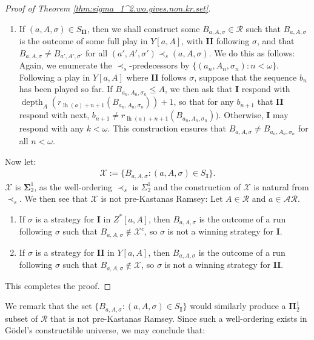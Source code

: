 \documentclass[11pt,reqno]{amsart}
\theoremstyle{plain}
\numberwithin{equation}{section}
\theoremstyle{definition}
\newcommand{\func}{\operatorname}
\newcommand{\cal}{\mathcal}
\newcommand{\X}{\cal{X}}
\newcommand{\lh}{\func{lh}}
\newcommand{\depth}{\func{depth}}
\begin{document}
\begin{proof}[Proof of Theorem \ref{thm:sigma_1^2.wo.gives.non.kr.set}]
\begin{enumerate}
        \item If $(a,A,\sigma) \in S_\textbf{II}$, then we shall construct some $B_{a,A,\sigma} \in \cal{R}$ such that $B_{a,A,\sigma}$ is the outcome of some full play in $Y[a,A]$, with \textbf{II} following $\sigma$, and that $B_{a,A,\sigma} \neq B_{a',A',\sigma'}$ for all $(a',A',\sigma') \prec_s (a,A,\sigma)$. We do this as follows: Again, we enumerate the $\prec_s$-predecessors by $\{(a_n,A_n,\sigma_n) : n < \omega\}$. Following a play in $Y[a,A]$ where \textbf{II} follows $\sigma$, suppose that the sequence $b_n$ has been played so far. If $B_{a_n,A_n,\sigma_n} \leq A$, we then ask that \textbf{I} respond with $\depth_A(r_{\lh(a)+n+1}(B_{a_n,A_n,\sigma_n})) + 1$, so that for any $b_{n+1}$ that \textbf{II} respond with next, $b_{n+1} \neq r_{\lh(a)+n+1}(B_{a_n,A_n,\sigma_n}))$. Otherwise, \textbf{I} may respond with any $k < \omega$. This construction ensures that $B_{a,A,\sigma} \neq B_{a_n,A_n,\sigma_n}$ for all $n < \omega$.
    \end{enumerate}
    Now let:
    \begin{align*}
        \X := \{B_{a,A,\sigma} : (a,A,\sigma) \in S_\textbf{I}\}.
    \end{align*}
    $\X$ is $\mathbf{\Sigma}_2^1$, as the well-ordering $\prec_s$ is $\Sigma_2^1$ and the construction of $\X$ is natural from $\prec_s$. We then see that $\X$ is not pre-Kastanas Ramsey: Let $A \in \cal{R}$ and $a \in \cal{AR}$.
    \begin{enumerate}
        \item If $\sigma$ is a strategy for \textbf{I} in $Z^*[a,A]$, then $B_{a,A,\sigma}$ is the outcome of a run following $\sigma$ such that $B_{a,A,\sigma} \notin \X^c$, so $\sigma$ is not a winning strategy for \textbf{I}.

        \item If $\sigma$ is a strategy for \textbf{II} in $Y[a,A]$, then $B_{a,A,\sigma}$ is the outcome of a run following $\sigma$ such that $B_{a,A,\sigma} \notin \X$, so $\sigma$ is not a winning strategy for \textbf{II}.
    \end{enumerate}
    This completes the proof.
\end{proof}


We remark that the set $\{B_{a,A,\sigma} : (a,A,\sigma) \in S_\textbf{I}\}$ would similarly produce a $\mathbf{\Pi}_2^1$ subset of $\cal{R}$ that is not pre-Kastanas Ramsey. Since such a well-ordering exists in G\"{o}del's constructible universe, we may conclude that:
\end{document}
